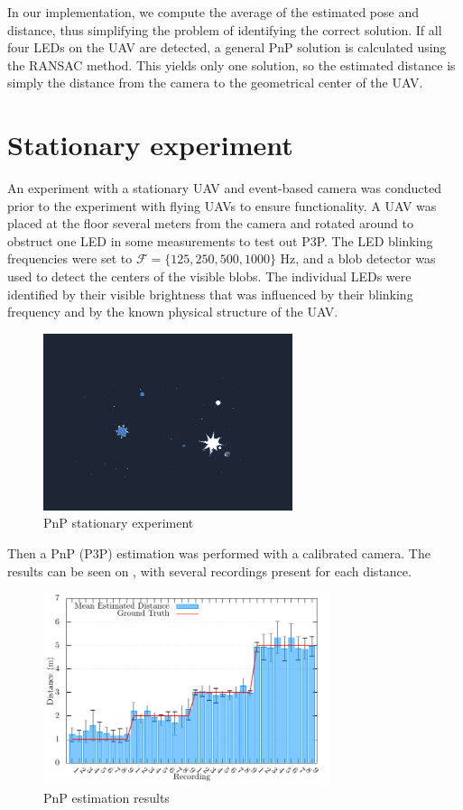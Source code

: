 In our implementation, we compute the average of the estimated pose and distance, thus simplifying the problem of identifying the correct solution. If all four \ac{LED}s on the \ac{UAV} are detected, a general \ac{PnP} solution is calculated using the \ac{RANSAC} method. This yields only one solution, so the
estimated distance is simply the distance from the camera to the geometrical center of the \ac{UAV}.

\section{Stationary experiment}
An experiment with a stationary \ac{UAV} and event-based camera was conducted prior to the experiment with flying \ac{UAV}s to ensure functionality.
A \ac{UAV} was placed at the floor several meters from the camera and rotated around to obstruct one \ac{LED} in some measurements to test out \ac{P3P}. The LED blinking frequencies were set to $\mathcal{F} = \{125, 250, 500, 1000\}$ Hz, and a blob detector was used to detect the centers of the visible blobs. The individual \ac{LED}s were identified by their visible brightness that was influenced by their blinking frequency and by the known physical structure of the \ac{UAV}.
\begin{figure}[H]
	\centering
	\includegraphics[width=0.65\textwidth]{./fig/photos/pnpmeas.png}
	\caption{PnP stationary experiment}
	\label{fig:pnpuav}
\end{figure}
Then a \ac{PnP} (\ac{P3P}) estimation was performed with a calibrated camera. The results can be seen on , with several recordings 
present for each distance.
\begin{figure}[H]
	\centering
	\includegraphics[width=0.75\textwidth]{./fig/tikz/pnp_results.pdf}
	\caption{PnP estimation results}
	\label{fig:pnpres}
\end{figure}

